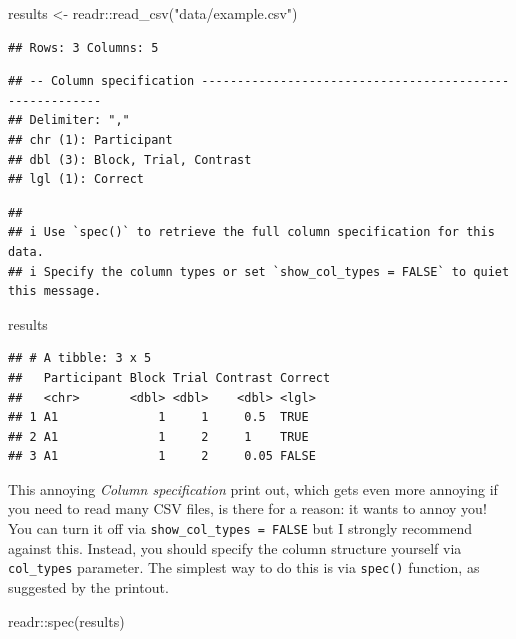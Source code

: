 \documentclass[
]{book}
\newenvironment{Shaded}{\begin{snugshade}}{\end{snugshade}}
\newcommand{\FunctionTok}[1]{\textcolor[rgb]{0.00,0.00,0.00}{#1}}
\newcommand{\NormalTok}[1]{#1}
\newcommand{\OtherTok}[1]{\textcolor[rgb]{0.56,0.35,0.01}{#1}}
\newcommand{\SpecialCharTok}[1]{\textcolor[rgb]{0.00,0.00,0.00}{#1}}
\newcommand{\StringTok}[1]{\textcolor[rgb]{0.31,0.60,0.02}{#1}}
\begin{document}
\begin{Shaded}
\begin{Highlighting}[]
\NormalTok{results }\OtherTok{\textless{}{-}}\NormalTok{ readr}\SpecialCharTok{::}\FunctionTok{read\_csv}\NormalTok{(}\StringTok{"data/example.csv"}\NormalTok{)}
\end{Highlighting}
\end{Shaded}

\begin{verbatim}
## Rows: 3 Columns: 5
\end{verbatim}

\begin{verbatim}
## -- Column specification --------------------------------------------------------
## Delimiter: ","
## chr (1): Participant
## dbl (3): Block, Trial, Contrast
## lgl (1): Correct
\end{verbatim}

\begin{verbatim}
## 
## i Use `spec()` to retrieve the full column specification for this data.
## i Specify the column types or set `show_col_types = FALSE` to quiet this message.
\end{verbatim}

\begin{Shaded}
\begin{Highlighting}[]
\NormalTok{results}
\end{Highlighting}
\end{Shaded}

\begin{verbatim}
## # A tibble: 3 x 5
##   Participant Block Trial Contrast Correct
##   <chr>       <dbl> <dbl>    <dbl> <lgl>  
## 1 A1              1     1     0.5  TRUE   
## 2 A1              1     2     1    TRUE   
## 3 A1              1     2     0.05 FALSE
\end{verbatim}

This annoying \emph{Column specification} print out, which gets even more annoying if you need to read many CSV files, is there for a reason: it wants to annoy you! You can turn it off via \texttt{show\_col\_types\ =\ FALSE} but I strongly recommend against this. Instead, you should specify the column structure yourself via \texttt{col\_types} parameter. The simplest way to do this is via \texttt{spec()} function, as suggested by the printout.

\begin{Shaded}
\begin{Highlighting}[]
\NormalTok{readr}\SpecialCharTok{::}\FunctionTok{spec}\NormalTok{(results)}
\end{Highlighting}
\end{Shaded}
\end{document}

